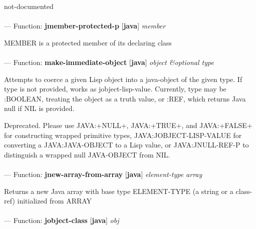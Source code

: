 \begin{adjustwidth}{5em}{5em}
not-documented
\end{adjustwidth}

\paragraph{}
\label{JAVA:JMEMBER-PROTECTED-P}
--- Function: \textbf{jmember-protected-p} [\textbf{java}] \textit{member}

\begin{adjustwidth}{5em}{5em}
MEMBER is a protected member of its declaring class
\end{adjustwidth}

\paragraph{}
\label{JAVA:MAKE-IMMEDIATE-OBJECT}
--- Function: \textbf{make-immediate-object} [\textbf{java}] \textit{object \&optional type}

\begin{adjustwidth}{5em}{5em}
Attempts to coerce a given Lisp object into a java-object of the
given type.  If type is not provided, works as jobject-lisp-value.
Currently, type may be :BOOLEAN, treating the object as a truth value,
or :REF, which returns Java null if NIL is provided.

Deprecated.  Please use JAVA:+NULL+, JAVA:+TRUE+, and JAVA:+FALSE+ for
constructing wrapped primitive types, JAVA:JOBJECT-LISP-VALUE for converting a
JAVA:JAVA-OBJECT to a Lisp value, or JAVA:JNULL-REF-P to distinguish a wrapped
null JAVA-OBJECT from NIL.
\end{adjustwidth}

\paragraph{}
\label{JAVA:JNEW-ARRAY-FROM-ARRAY}
--- Function: \textbf{jnew-array-from-array} [\textbf{java}] \textit{element-type array}

\begin{adjustwidth}{5em}{5em}
Returns a new Java array with base type ELEMENT-TYPE (a string or a class-ref)
   initialized from ARRAY
\end{adjustwidth}

\paragraph{}
\label{JAVA:JOBJECT-CLASS}
--- Function: \textbf{jobject-class} [\textbf{java}] \textit{obj}

